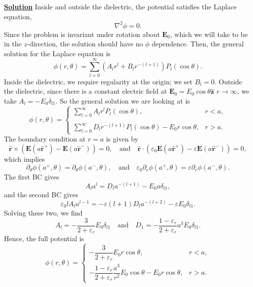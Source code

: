 \noindent \underline{\textbf{Solution}} Inside and outside the dielectric, the potential satisfies the Laplace equation,
\begin{equation}
    \nabla^2\phi = 0.
\end{equation}
Since the problem is invariant under rotation about $\mathbf{E}_0$, which we will take to be in the $z$-direction, the solution should have no $\phi$ dependence. Then, the general solution for the Laplace equation is 
\begin{equation}
    \phi(r,\theta) =  \sum_{l=0}^\infty (A_lr^{l} + B_lr^{-(l+1)})P_l(\cos\theta).
\end{equation}
Inside the dielectric, we require regularity at the origin; we set $B_l =0$. Outside the dielectric, since there is a constant electric field at $\mathbf{E}_0 = E_0\cos\theta\hat{\mathbf{z}}$ $r\to\infty $, we take $A_l = -E_0\delta_{l1}$. So the general solution we are looking at is
\begin{equation}
    \phi(r,\theta)  = \begin{cases}
        \displaystyle\sum_{l=0}^\infty A_lr^lP_l(\cos\theta),&r<a,\\
        \\\displaystyle\sum_{l=0}^\infty D_lr^{-(l+1)}P_l(\cos\theta) -E_0r\cos\theta,&r>a.
    \end{cases}
\end{equation}
The boundary condition at $r=a$ is given by
\begin{equation}
    \hat{\mathbf{r}}\times(\mathbf{E}(a\hat{\mathbf{r}}^+)-\mathbf{E}(a\hat{\mathbf{r}}^-)) = 0,\quad \text{and} \quad \hat{\mathbf{r}}\cdot(\varepsilon_0\mathbf{E}(a\hat{\mathbf{r}}^+)-\varepsilon\mathbf{E}(a\hat{\mathbf{r}}^-)) = 0,
\end{equation}
which implies
\begin{equation}
    \partial_\theta\phi(a^+,\theta) = \partial_\theta\phi(a^-,\theta), \quad \text{and} \quad \varepsilon_0\partial_r\phi(a^+,\theta) = \varepsilon\partial_r\phi(a^-,\theta).
\end{equation}
The first BC gives
\begin{equation}
    A_la^l = D_la^{-(l+1)}-E_0a\delta_{l1},
\end{equation}
and the second BC gives
\begin{equation}
    \varepsilon_0lA_la^{l-1} =-\varepsilon(l+1)D_la^{-(l+2)}-\varepsilon E_0\delta_{l1}.
\end{equation}
Solving these two, we find
\begin{equation}
    A_l = -\frac{3}{2+\varepsilon_r}E_0 \delta_{l1}\quad\text{and} \quad D_1 = -\frac{1-\varepsilon_r}{2+\varepsilon_r}a^3E_0\delta_{l1}.
\end{equation}
Hence, the full potential is
\begin{equation}
    \phi(r,\theta) = \begin{cases}
        -\dfrac{3}{2+\varepsilon_r}E_0r\cos\theta, & r<a,\\
        -\dfrac{1-\varepsilon_r}{2+\varepsilon_r}\dfrac{a^3}{r^2}E_0\cos\theta-E_0r\cos\theta, & r>a.
    \end{cases}
\end{equation}

